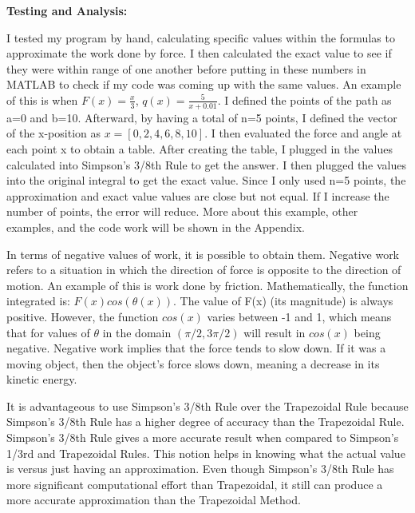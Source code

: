 \documentclass{article}
\begin{document}
{\bf Testing and Analysis:} {\color{black} I tested my program by hand, calculating specific values within the formulas to approximate the work done by force.  I then calculated the exact value to see if they were within range of one another before putting in these numbers in MATLAB to check if my code was coming up with the same values.  An example of this is when $F(x)=\frac{x}{3}$, $q(x)=\frac{5}{x+0.01}$.  I defined the points of the path as a=0 and b=10.  Afterward, by having a total of n=5 points, I defined the vector of the x-position as $x=[0,2,4,6,8,10]$.  I then evaluated the force and angle at each point x to obtain a table.  After creating the table, I plugged in the values calculated into Simpson’s 3/8th Rule to get the answer.  I then plugged the values into the original integral to get the exact value.  Since I only used n=5 points, the approximation and exact value values are close but not equal.  If I increase the number of points, the error will reduce.  More about this example, other examples, and the code work will be shown in the Appendix.  
\par \bigskip \par
In terms of negative values of work, it is possible to obtain them.  Negative work refers to a situation in which the direction of force is opposite to the direction of motion.  An example of this is work done by friction.  Mathematically, the function integrated is: $F(x)cos(\theta(x))$.  The value of F(x) (its magnitude) is always positive. However, the function $cos(x)$ varies between -1 and 1, which means that for values of $\theta$ in the domain $(\pi/2,3\pi/2)$ will result in $cos(x)$ being negative.  Negative work implies that the force tends to slow down.  If it was a moving object, then the object’s force slows down, meaning a decrease in its kinetic energy.
\par \bigskip \par
It is advantageous to use Simpson’s 3/8th Rule over the Trapezoidal Rule because Simpson’s 3/8th Rule has a higher degree of accuracy than the Trapezoidal Rule.  Simpson’s 3/8th Rule gives a more accurate result when compared to Simpson’s 1/3rd and Trapezoidal Rules.  This notion helps in knowing what the actual value is versus just having an approximation.  Even though Simpson’s 3/8th Rule has more significant computational effort than Trapezoidal, it still can produce a more accurate approximation than the Trapezoidal Method.
 
\par \bigskip \par
}
\end{document}
